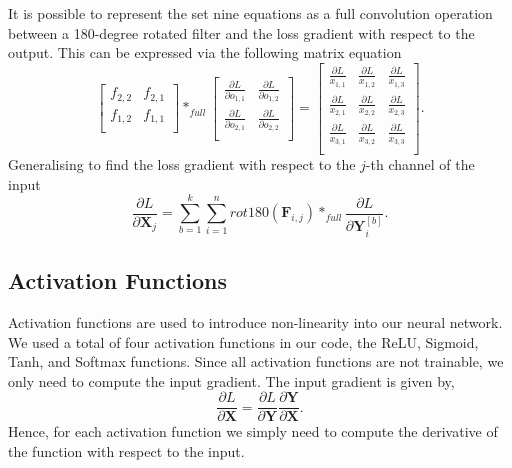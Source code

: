\documentclass[twocolumn,pra,floatfix]{revtex4-2}
\begin{document}
                It is possible to represent the set nine equations as a full convolution operation between a 180-degree rotated filter and the loss gradient with respect to the output. This can be expressed via the following matrix equation
                \begin{equation}
                    \begin{bmatrix}
                        f_{2,2} & f_{2,1} \\
                        f_{1,2} & f_{1,1} \\
                    \end{bmatrix} \ast_{full}
                    \begin{bmatrix}
                        \frac{\partial L}{\partial o_{1,1}} & \frac{\partial L}{\partial o_{1,2}} \\[0.5em]
                        \frac{\partial L}{\partial o_{2,1}} & \frac{\partial L}{\partial o_{2,2}} \\[0.5em]
                    \end{bmatrix} = 
                    \begin{bmatrix}
                        \frac{\partial L}{x_{1,1}} & \frac{\partial L}{x_{1,2}} & \frac{\partial L}{x_{1,3}} \\[0.5em]
                        \frac{\partial L}{x_{2,1}} & \frac{\partial L}{x_{2,2}} & \frac{\partial L}{x_{2,3}} \\[0.5em]
                        \frac{\partial L}{x_{3,1}} & \frac{\partial L}{x_{3,2}} & \frac{\partial L}{x_{3,3}} \\[0.5em]
                    \end{bmatrix}.
                \end{equation}
                Generalising to find the loss gradient with respect to the $j$-th channel of the input 
                \begin{equation}
                    \frac{\partial L}{\partial \mathbf{X}_{j}} = \sum_{b=1}^{k}\sum_{i=1}^{n}rot180(\mathbf{F}_{i,j}) \ast_{full}\frac{\partial L}{\partial \mathbf{Y}_{i}^{[b]}}.
                \end{equation}

        \subsection{Activation Functions}
            
            Activation functions are used to introduce non-linearity into our neural network. We used a total of four activation functions in our code, the ReLU, Sigmoid, Tanh, and Softmax functions. Since all activation functions are not trainable, we only need to compute the input gradient. The input gradient is given by,
            \begin{equation}
                \frac{\partial L}{\partial \mathbf{X}} = \frac{\partial L}{\partial \mathbf{Y}} \frac{\partial \mathbf{Y}}{\partial \mathbf{X}}. 
                \label{eq:input_gradient_activation}
            \end{equation}
            Hence, for each activation function we simply need to compute the derivative of the function with respect to the input.
                
\end{document}
